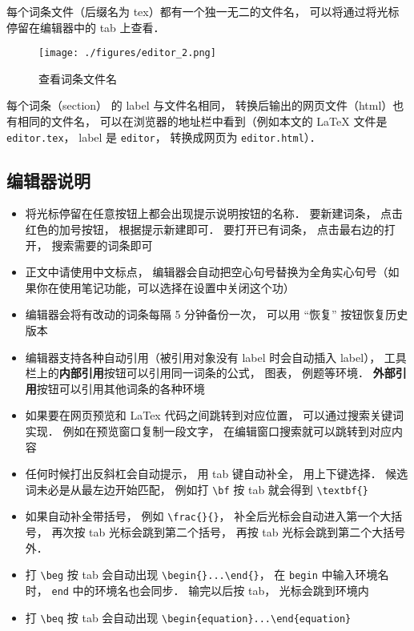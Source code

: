 每个词条文件（后缀名为 tex）都有一个独一无二的文件名， 可以将通过将光标停留在编辑器中的 tab 上查看．

\begin{figure}[ht]
\centering
\texttt{[image: ./figures/editor\_2.png]}
\caption{查看词条文件名} \label{editor_fig2}
\end{figure}

每个词条（section） 的 label 与文件名相同， 转换后输出的网页文件（html）也有相同的文件名， 可以在浏览器的地址栏中看到（例如本文的 LaTeX 文件是 \verb|editor.tex|， label 是 \verb|editor|， 转换成网页为 \verb|editor.html|）．

\subsection{编辑器说明}
\begin{itemize}
\item 将光标停留在任意按钮上都会出现提示说明按钮的名称． 要新建词条， 点击红色的加号按钮， 根据提示新建即可． 要打开已有词条， 点击最右边的打开， 搜索需要的词条即可
\item 正文中请使用中文标点， 编辑器会自动把空心句号替换为全角实心句号（如果你在使用笔记功能，可以选择在设置中关闭这个功）
\item 编辑器会将有改动的词条每隔 5 分钟备份一次， 可以用 “恢复” 按钮恢复历史版本
\item 编辑器支持各种自动引用（被引用对象没有 label 时会自动插入 label）， 工具栏上的\textbf{内部引用}按钮可以引用同一词条的公式， 图表， 例题等环境． \textbf{外部引用}按钮可以引用其他词条的各种环境
\item 如果要在网页预览和 LaTex 代码之间跳转到对应位置， 可以通过搜索关键词实现． 例如在预览窗口复制一段文字， 在编辑窗口搜索就可以跳转到对应内容
\item 任何时候打出反斜杠会自动提示， 用 tab 键自动补全， 用上下键选择． 候选词未必是从最左边开始匹配， 例如打 \verb|\bf| 按 tab 就会得到 \verb|\textbf{}|
\item 如果自动补全带括号， 例如 \verb|\frac{}{}|， 补全后光标会自动进入第一个大括号， 再次按 tab 光标会跳到第二个括号， 再按 tab 光标会跳到第二个大括号外．
\item 打 \verb|\beg| 按 tab 会自动出现 \verb|\begin{}...\end{}|， 在 \verb|begin| 中输入环境名时， \verb|end| 中的环境名也会同步． 输完以后按 tab， 光标会跳到环境内
\item 打 \verb|\beq| 按 tab 会自动出现 \verb|\begin{equation}...\end{equation}|

\end{itemize}
